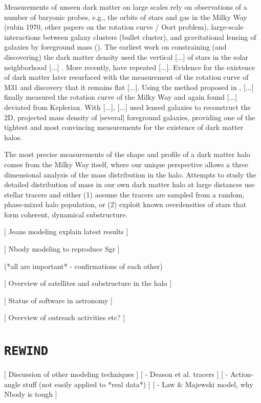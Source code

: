 \documentclass[letterpaper,12pt,preprint]{aastex}
\begin{document}
Measurements of unseen dark matter on large scales rely on observations of a number of baryonic probes, e.g., the orbits of stars and gas in the Milky Way (rubin 1970, other papers on the rotation curve / Oort problem), large-scale interactions between galaxy clusters (bullet cluster), and gravitational lensing of galaxies by foreground mass (). The earliest work on constraining (and discovering) the dark matter density used the vertical [...] of stars in the solar neighborhood [...] \citep[now known as the \emph{Oort Problem},][]{oort32}. More recently, \cite{bovy12} have repeated [...]. Evidence for the existence of dark matter later resurfaced with the measurement of the rotation curve of M31 \citep{rubin70} and discovery that it remains flat [...]. Using the method proposed in \cite{merrifield92}, [...] finally measured the rotation curve of the Milky Way and again found [...] deviated from Keplerian. With [...], [...] used lensed galaxies to reconstruct the 2D, projected mass density of [several] foreground galaxies, providing one of the tightest and most convincing measurements for the existence of dark matter halos. 

The most precise measurements of the shape and profile of a dark matter halo comes from the Milky Way itself, where our unique perspective allows a three dimensional analysis of the mass distribution in the halo. Attempts to study the detailed distribution of mass in our own dark matter halo at large distances use stellar tracers and either (1) assume the tracers are sampled from a random, phase-mixed halo population, or (2) exploit known overdensities of stars that form coherent, dynamical substructure. 

[ Jeans modeling explain latest \cite{deason12} results ]

[ Nbody modeling to reproduce Sgr ]

(*all are important* - confirmations of each other)

[ Overview of satellites and substructure in the halo ]

[ Status of software in astronomy ]

[ Overview of outreach activities etc? ]

\section{\texttt{REWIND}}

[ Discussion of other modeling techniques ]
[ - Deason et al. tracers ]
[ - Action-angle stuff (not easily applied to *real data*) ]
[ - Law \& Majewski model, why Nbody is tough ]
\end{document}
